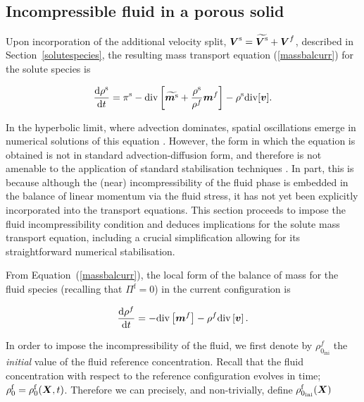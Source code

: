 \subsection{Incompressible fluid in a porous solid}
\label{incompressible-fluid-porous-solid}

Upon incorporation of the additional velocity split,
$\mbox{\boldmath$ V$}^\mathrm{s}=\widetilde{\mbox{\boldmath$ V$}^\mathrm{s}}+\mbox{\boldmath$ V$}^f$, described in
Section~\ref{solutespecies}, the resulting mass transport equation
(\ref{massbalcurr}) for the solute species is

\begin{equation}
\frac{\mathrm{d}\rho^\mathrm{s}}{\mathrm{d}t} = \pi^\mathrm{s}-
\mathrm{div} \left[\widetilde{\mbox{\boldmath$ m$}^\mathrm{s}}+
\frac{\rho^\mathrm{s}}{\rho^f}\mbox{\boldmath$ m$}^f\right] - \rho^\mathrm{s}
\mathrm{div}[\mbox{\boldmath$ v$}].
\label{massbalcurrsol}
\end{equation}

\noindent In the hyperbolic limit, where advection dominates, spatial
oscillations emerge in numerical solutions of this equation
\citep{Brooks:82,Paper6}. However, the form in which the equation is
obtained is not in standard advection-diffusion form, and therefore is
not amenable to the application of standard stabilisation techniques
\citep{Paper6}. In part, this is because although the (near)
incompressibility of the fluid phase is embedded in the balance of
linear momentum via the fluid stress, it has not yet been explicitly
incorporated into the transport equations. This section proceeds to
impose the fluid incompressibility condition and deduces implications
for the solute mass transport equation, including a crucial
simplification allowing for its straightforward numerical
stabilisation.

From \mbox{Equation (\ref{massbalcurr})}, the local form of the
balance of mass for the fluid species (recalling that
$\Pi^\mathrm{f}=0$) in the current configuration is

\begin{equation}
\frac{\mathrm{d}\rho^f}{\mathrm{d}t} = - \mathrm{div}\left[\mbox{\boldmath$ m$}^f\right]
- \rho^f \mathrm{div}\left[\mbox{\boldmath$ v$}\right].
\label{fluidtransporteqn}
\end{equation}

\noindent In order to impose the incompressibility of the fluid, we
first denote by $\rho_{0_{\mathrm{ini}}}^{f}$ the {\sl initial} value
of the fluid reference concentration. Recall that the fluid
concentration with respect to the reference configuration evolves in
time; $\rho^\mathrm{f}_0 = \rho^\mathrm{f}_0(\mbox{\boldmath$ X$},t)$. Therefore we can
precisely, and non-trivially, define
$\rho_{0_{\mathrm{ini}}}^{\mathrm{f}}(\mbox{\boldmath$ X$})$   

